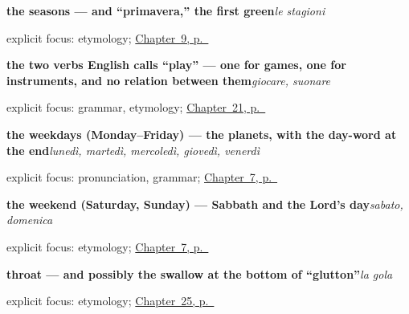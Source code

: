 \noindent\begin{minipage}[t]{\linewidth}
\raggedright
\textbf{the seasons — and \textquotedblleft{}primavera,\textquotedblright{} the first green}\enspace\emph{le stagioni}\par
\footnotesize explicit focus: etymology; \hyperref[ch:it-months-and-seasons]{Chapter~9, p.~\pageref*{ch:it-months-and-seasons}}
\end{minipage}\par\smallskip

\noindent\begin{minipage}[t]{\linewidth}
\raggedright
\textbf{the two verbs English calls \textquotedblleft{}play\textquotedblright{} — one for games, one for instruments, and no relation between them}\enspace\emph{giocare, suonare}\par
\footnotesize explicit focus: grammar, etymology; \hyperref[ch:it-play-get-answer]{Chapter~21, p.~\pageref*{ch:it-play-get-answer}}
\end{minipage}\par\smallskip

\noindent\begin{minipage}[t]{\linewidth}
\raggedright
\textbf{the weekdays (Monday–Friday) — the planets, with the day-word at the end}\enspace\emph{lunedì, martedì, mercoledì, giovedì, venerdì}\par
\footnotesize explicit focus: pronunciation, grammar; \hyperref[ch:it-days-of-the-week]{Chapter~7, p.~\pageref*{ch:it-days-of-the-week}}
\end{minipage}\par\smallskip

\noindent\begin{minipage}[t]{\linewidth}
\raggedright
\textbf{the weekend (Saturday, Sunday) — Sabbath and the Lord's day}\enspace\emph{sabato, domenica}\par
\footnotesize explicit focus: etymology; \hyperref[ch:it-days-of-the-week]{Chapter~7, p.~\pageref*{ch:it-days-of-the-week}}
\end{minipage}\par\smallskip

\noindent\begin{minipage}[t]{\linewidth}
\raggedright
\textbf{throat — and possibly the swallow at the bottom of \textquotedblleft{}glutton\textquotedblright{}}\enspace\emph{la gola}\par
\footnotesize explicit focus: etymology; \hyperref[ch:it-nose-stomach-throat]{Chapter~25, p.~\pageref*{ch:it-nose-stomach-throat}}
\end{minipage}\par\smallskip

